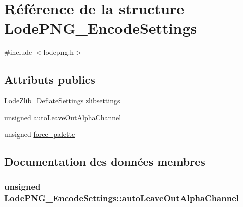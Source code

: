 \hypertarget{struct_lode_p_n_g___encode_settings}{}\section{Référence de la structure Lode\+P\+N\+G\+\_\+\+Encode\+Settings}
\label{struct_lode_p_n_g___encode_settings}


{\ttfamily \#include $<$lodepng.\+h$>$}

\subsection*{Attributs publics}
\begin{DoxyCompactItemize}
\item 
\hyperlink{struct_lode_zlib___deflate_settings}{Lode\+Zlib\+\_\+\+Deflate\+Settings} \hyperlink{struct_lode_p_n_g___encode_settings_addba4b351da6bace64c02a264be74f53}{zlibsettings}
\item 
unsigned \hyperlink{struct_lode_p_n_g___encode_settings_a5074182840fae2ac4399ca9fa6660b41}{auto\+Leave\+Out\+Alpha\+Channel}
\item 
unsigned \hyperlink{struct_lode_p_n_g___encode_settings_a44de1047cd9f3bfd55bf8c5313620065}{force\+\_\+palette}
\end{DoxyCompactItemize}


\subsection{Documentation des données membres}
\hypertarget{struct_lode_p_n_g___encode_settings_a5074182840fae2ac4399ca9fa6660b41}{}
\subsubsection[{auto\+Leave\+Out\+Alpha\+Channel}]{\setlength{\rightskip}{0pt plus 5cm}unsigned Lode\+P\+N\+G\+\_\+\+Encode\+Settings\+::auto\+Leave\+Out\+Alpha\+Channel}\label{struct_lode_p_n_g___encode_settings_a5074182840fae2ac4399ca9fa6660b41}
\hypertarget{struct_lode_p_n_g___encode_settings_a44de1047cd9f3bfd55bf8c5313620065}{}
